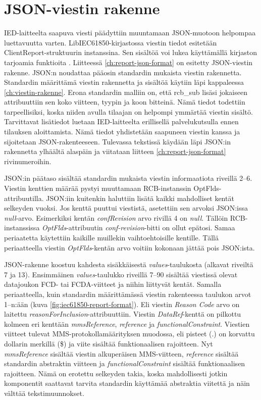 \section{JSON-viestin rakenne}
IED-laitteelta saapuva viesti päädyttiin muuntamaan JSON-muotoon helpompaa luettavuutta varten. LibIEC61850-kirjastossa viestin tiedot esitetään ClientReport-struk\-tuu\-rin instanssina. Sen sisältöä voi lukea käyttämällä kirjaston tarjoamia funktioita \cite{libIEC61850-doc}.  Liitteessä \ref{ch:report-json-format} on esitetty JSON-viestin rakenne. JSON:n noudattaa pääosin standardin mukaista viestin rakennetta. Standardin määrittämä viestin rakennetta ja sisältöä käytiin läpi kappaleessa \ref{ch:viestin-rakenne}. Erona standardin malliin on, että rcb\_sub lisäsi jokaiseen attribuuttiin sen koko viitteen, tyypin ja koon bitteinä. Nämä tiedot todettiin tarpeellisiksi, koska niiden avulla tilaajan on helpompi ymmärtää viestin sisältö. Tarvittavat lisätiedot luetaan IED-laitteelta erillisellä palvelukutsulla ennen tilauksen aloittamista. Nämä tiedot yhdistetään saapuneen viestin kanssa ja sijoitetaan JSON-rakenteeseen. Tulevassa tekstissä käydään läpi JSON:in rakennetta ylhäältä alaspäin ja viitataan liitteen \ref{ch:report-json-format} rivinumeroihin.

JSON:in päätaso sisältää standardin mukaista viestin informaatiota riveillä 2--6. Viestin kenttien määrää pystyi muuttamaan RCB-instanssin OptFlds-attribuutilla. JSON:iin kuitenkin haluttiin lisätä kaikki mahdolliset kentät selkeyden vuoksi. Jos kenttä puuttui viestistä, asetettiin sen arvoksi JSON:issa \emph{null}-arvo. Esimerkiksi kentän \emph{confRevision} arvo rivillä 4 on \emph{null}. Tällöin RCB-instanssissa \emph{OptFlds}-attribuutin \emph{conf-revision}-bitti on ollut epätosi. Samaa periaatetta käytettiin kaikille muillekin vaihtoehtoisille kentille. Tällä periaatteella viestin \emph{OptFlds}-kentän arvo voitiin kokonaan jättää pois JSON:ista.

JSON-rakenne koostuu kahdesta sisäkkäisestä \emph{values}-taulukosta (alkavat riveiltä 7 ja 13). Ensimmäinen \emph{values}-taulukko riveillä 7--90 sisältää viestissä olevat datajoukon FCD- tai FCDA-viitteet ja niihin liittyvät kentät. Samalla periaatteella, kuin standardin määrittämässä viestin rakenteessa taulukon arvot 1--n:ään (kuva \ref{fig:iec61850-report-format}). Eli viestin \emph{Reason Code} arvo on laitettu \emph{reasonForInclusion}-attribuuttiin. Viestin \emph{DataRef}-kenttä on pilkottu kolmeen eri kenttään \emph{mmsReference}, \emph{reference} ja \emph{functionalConstraint}. Viestien viitteet tulevat MMS-protokollamäärityksen muodossa, eli pisteet (.) on korvattu dollarin merkillä (\$) ja viite sisältää funktionaalisen rajoitteen. Nyt \emph{mmsReference} sisältää viestin alkuperäisen MMS-viitteen, \emph{reference} sisältää standardin abstraktin viitteen ja \emph{functionalConstraint} sisältää funktionaalisen rajoitteen. Nämä on erotettu selkeyden takia, koska mahdollisesti jotkin komponentit saattavat tarvita standardin käyttämää abstraktia viitettä ja näin välttää tekstimuunnokset.

